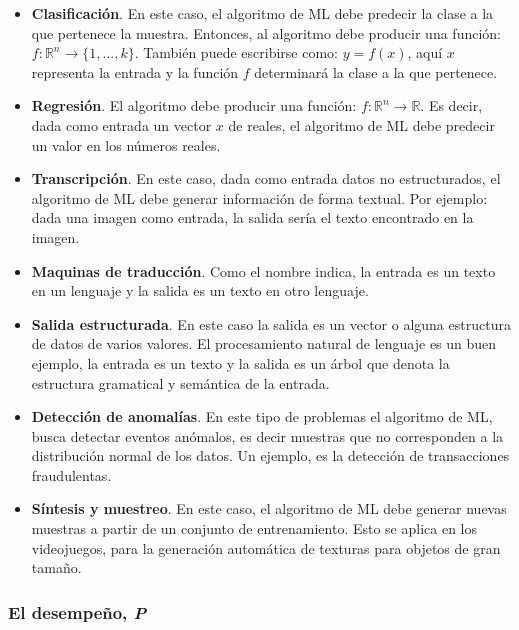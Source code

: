 \begin{itemize}
	\item \textbf{Clasificación}. En este caso, el algoritmo de ML debe predecir la clase a la que pertenece la muestra. Entonces, al algoritmo debe producir una función: $f: \mathbb{R}^n \rightarrow \{ 1, ..., k \}$. También puede escribirse como: $y = f(x)$, aquí $x$ representa la entrada y la función $f$ determinará la clase a la que pertenece.
	
	\item \textbf{Regresión}.  El algoritmo debe producir una función: $f: \mathbb{R}^n \rightarrow \mathbb{R}$. Es decir, dada como entrada un vector $x$ de reales, el algoritmo de ML debe predecir un valor en los números reales.
	
	\item \textbf{Transcripción}. En este caso, dada como entrada datos no estructurados, el algoritmo de ML debe generar información de forma textual. Por ejemplo: dada una imagen como entrada, la salida sería el texto encontrado en la imagen.
	
	\item \textbf{Maquinas de traducción}. Como el nombre indica, la entrada es un texto en un lenguaje y la salida es un texto en otro lenguaje.
	
	\item \textbf{Salida estructurada}. En este caso la salida es un vector o alguna estructura de datos de varios valores. El procesamiento natural de lenguaje es un buen ejemplo, la entrada es un texto y la salida es un árbol que denota la estructura gramatical y semántica de la entrada.
	
	\item \textbf{Detección de anomalías}. En este tipo de problemas el algoritmo de ML, busca detectar eventos anómalos, es decir muestras que no corresponden a la distribución normal de los datos. Un ejemplo, es la detección de transacciones fraudulentas.
	
	\item \textbf{Síntesis y muestreo}. En este caso, el algoritmo de ML debe generar nuevas muestras a partir de un conjunto de entrenamiento. Esto se aplica en los videojuegos, para la generación automática de texturas para objetos de gran tamaño.
	
	
	

\end{itemize}

\subsubsection{El desempeño, \textit{P}}


